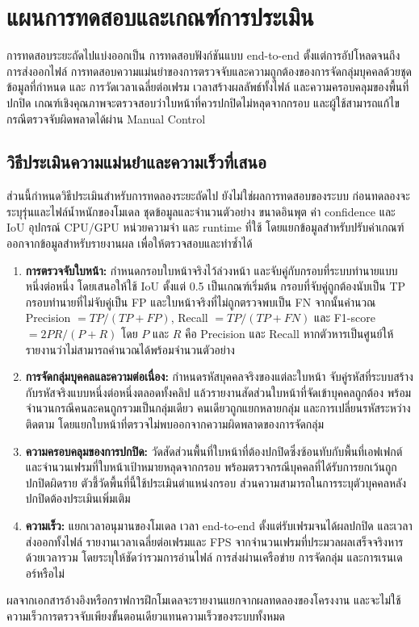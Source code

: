 \section{แผนการทดสอบและเกณฑ์การประเมิน}

การทดสอบระยะถัดไปแบ่งออกเป็น การทดสอบฟังก์ชันแบบ end-to-end ตั้งแต่การอัปโหลดจนถึงการส่งออกไฟล์ การทดสอบความแม่นยำของการตรวจจับและความถูกต้องของการจัดกลุ่มบุคคลด้วยชุดข้อมูลที่กำหนด และ การวัดเวลาเฉลี่ยต่อเฟรม เวลาสร้างผลลัพธ์ทั้งไฟล์ และความครอบคลุมของพื้นที่ปกปิด เกณฑ์เชิงคุณภาพจะตรวจสอบว่าใบหน้าที่ควรปกปิดไม่หลุดจากกรอบ และผู้ใช้สามารถแก้ไขกรณีตรวจจับผิดพลาดได้ผ่าน Manual Control

\subsection{วิธีประเมินความแม่นยำและความเร็วที่เสนอ}

ส่วนนี้กำหนดวิธีประเมินสำหรับการทดลองระยะถัดไป ยังไม่ใช่ผลการทดสอบของระบบ ก่อนทดลองจะระบุรุ่นและไฟล์น้ำหนักของโมเดล ชุดข้อมูลและจำนวนตัวอย่าง ขนาดอินพุต ค่า confidence และ IoU อุปกรณ์ CPU/GPU หน่วยความจำ และ runtime ที่ใช้ โดยแยกข้อมูลสำหรับปรับค่าเกณฑ์ออกจากข้อมูลสำหรับรายงานผล เพื่อให้ตรวจสอบและทำซ้ำได้

\begin{enumerate}[
  label=(\arabic*),
  labelindent=0pt,
  leftmargin=\firstindentlength,
  labelwidth=0.65\firstindentlength,
  labelsep=0.35\firstindentlength,
  itemindent=0pt,
  align=left,
  listparindent=0pt,
  topsep=0.4\baselineskip,
  itemsep=0.4\baselineskip,
  parsep=0pt
]
  \item \textbf{การตรวจจับใบหน้า:} กำหนดกรอบใบหน้าจริงไว้ล่วงหน้า และจับคู่กับกรอบที่ระบบทำนายแบบหนึ่งต่อหนึ่ง โดยเสนอให้ใช้ IoU ตั้งแต่ 0.5 เป็นเกณฑ์เริ่มต้น กรอบที่จับคู่ถูกต้องนับเป็น TP กรอบทำนายที่ไม่จับคู่เป็น FP และใบหน้าจริงที่ไม่ถูกตรวจพบเป็น FN จากนั้นคำนวณ Precision $=TP/(TP+FP)$, Recall $=TP/(TP+FN)$ และ F1-score $=2PR/(P+R)$ โดย $P$ และ $R$ คือ Precision และ Recall หากตัวหารเป็นศูนย์ให้รายงานว่าไม่สามารถคำนวณได้พร้อมจำนวนตัวอย่าง
  \item \textbf{การจัดกลุ่มบุคคลและความต่อเนื่อง:} กำหนดรหัสบุคคลจริงของแต่ละใบหน้า จับคู่รหัสที่ระบบสร้างกับรหัสจริงแบบหนึ่งต่อหนึ่งตลอดทั้งคลิป แล้วรายงานสัดส่วนใบหน้าที่จัดเข้าบุคคลถูกต้อง พร้อมจำนวนกรณีคนละคนถูกรวมเป็นกลุ่มเดียว คนเดียวถูกแยกหลายกลุ่ม และการเปลี่ยนรหัสระหว่างติดตาม โดยแยกใบหน้าที่ตรวจไม่พบออกจากความผิดพลาดของการจัดกลุ่ม
  \item \textbf{ความครอบคลุมของการปกปิด:} วัดสัดส่วนพื้นที่ใบหน้าที่ต้องปกปิดซึ่งซ้อนทับกับพื้นที่เอฟเฟกต์ และจำนวนเฟรมที่ใบหน้าเป้าหมายหลุดจากกรอบ พร้อมตรวจกรณีบุคคลที่ได้รับการยกเว้นถูกปกปิดผิดราย ตัวชี้วัดพื้นที่นี้ใช้ประเมินตำแหน่งกรอบ ส่วนความสามารถในการระบุตัวบุคคลหลังปกปิดต้องประเมินเพิ่มเติม
  \item \textbf{ความเร็ว:} แยกเวลาอนุมานของโมเดล เวลา end-to-end ตั้งแต่รับเฟรมจนได้ผลปกปิด และเวลาส่งออกทั้งไฟล์ รายงานเวลาเฉลี่ยต่อเฟรมและ FPS จากจำนวนเฟรมที่ประมวลผลเสร็จจริงหารด้วยเวลารวม โดยระบุให้ชัดว่ารวมการอ่านไฟล์ การส่งผ่านเครือข่าย การจัดกลุ่ม และการเรนเดอร์หรือไม่
\end{enumerate}

ผลจากเอกสารอ้างอิงหรือกราฟการฝึกโมเดลจะรายงานแยกจากผลทดลองของโครงงาน และจะไม่ใช้ความเร็วการตรวจจับเพียงขั้นตอนเดียวแทนความเร็วของระบบทั้งหมด

\endgroup
